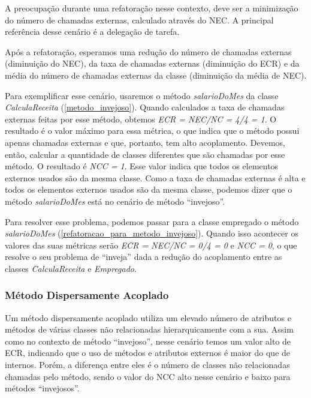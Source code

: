 	A preocupação durante uma refatoração nesse contexto, deve ser a minimização do número de chamadas externas, calculado através do NEC. A principal referência desse cenário é a delegação de tarefa.
	
	Após a refatoração, esperamos uma redução do número de chamadas externas (diminuição do NEC), da taxa de chamadas externas (diminuição do ECR) e da média do número de chamadas externas da classe (diminuição da média de NEC).
                      
	Para exemplificar esse cenário, usaremos o método \textit{salarioDoMes} da classe \textit{CalculaReceita} (\ref{metodo_invejoso}). Quando calculados a taxa de chamadas externas feitas por esse método, obtemos \textit{ECR = NEC/NC = 4/4 = 1}. O resultado é o valor máximo para essa métrica, o que indica que o método possui apenas chamadas externas e que, portanto, tem alto acoplamento. Devemos, então, calcular a quantidade de classes diferentes que são chamadas por esse método. O resultado é \textit{NCC = 1}. Esse valor indica que todos os elementos externos usados são da mesma classe. Como a taxa de chamadas externas é alta e todos os elementos externos usados são da mesma classe, podemos dizer que o método \textit{salarioDoMes} está no cenário de método ``invejoso''.

	                                      

	Para resolver esse problema, podemos passar para a classe empregado o método \textit{salarioDoMes} (\ref{refatoracao_para_metodo_invejoso}). Quando isso acontecer os valores das suas métricas serão \textit{ECR = NEC/NC = 0/4 = 0} e \textit{NCC = 0}, o que resolve o seu problema de ``inveja'' dada a redução do acoplamento entre as classes \textit{CalculaReceita} e \textit{Empregado}. 

	


\subsubsection{Método Dispersamente Acoplado}
	
	Um método dispersamente acoplado utiliza um elevado número de atributos e métodos de várias classes não relacionadas hierarquicamente com a sua. Assim como no contexto de método ``invejoso'', nesse cenário temos um valor alto de ECR, indicando que o uso de métodos e atributos externos é maior do que de internos. Porém, a diferença entre eles é o número de classes não relacionadas chamadas pelo método, sendo o valor do NCC alto nesse cenário e baixo para métodos ``invejosos''.
	

